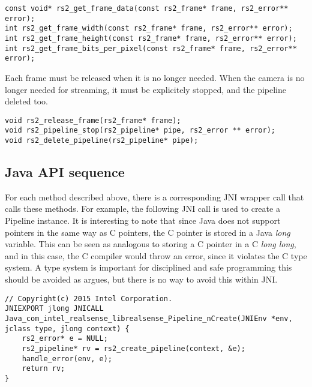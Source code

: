     \begin{lstlisting}[style=CStyle]
const void* rs2_get_frame_data(const rs2_frame* frame, rs2_error** error);
int rs2_get_frame_width(const rs2_frame* frame, rs2_error** error);
int rs2_get_frame_height(const rs2_frame* frame, rs2_error** error);
int rs2_get_frame_bits_per_pixel(const rs2_frame* frame, rs2_error** error);\end{lstlisting}

    Each frame must be released when it is no longer needed. When the camera is no longer needed for streaming, it must be explicitely stopped, and the pipeline deleted too.
    \begin{lstlisting}[style=CStyle]
void rs2_release_frame(rs2_frame* frame);
void rs2_pipeline_stop(rs2_pipeline* pipe, rs2_error ** error);
void rs2_delete_pipeline(rs2_pipeline* pipe);\end{lstlisting}


    \subsection{Java API sequence}
    For each method described above, there is a corresponding JNI wrapper call that calls these methods. For example, the following JNI call is used to create a Pipeline instance. It is interesting to note that since Java does not support pointers in the same way as C pointers, the C pointer is stored in a Java {\slshape long} variable. This can be seen as analogous to storing a C pointer in a C {\slshape long long}, and in this case, the C compiler would throw an error, since it violates the C type system. A type system is important for disciplined and safe programming this should be avoided as \cite{pierce2002types} argues, but there is no way to avoid this within JNI.
    \begin{lstlisting}[style=CStyle]
// Copyright(c) 2015 Intel Corporation.
JNIEXPORT jlong JNICALL Java_com_intel_realsense_librealsense_Pipeline_nCreate(JNIEnv *env, jclass type, jlong context) {
    rs2_error* e = NULL;
    rs2_pipeline* rv = rs2_create_pipeline(context, &e);
    handle_error(env, e);
    return rv;
}\end{lstlisting}

